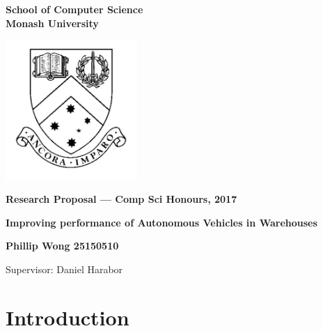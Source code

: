 \documentclass[a4paper,11pt]{article}
\begin{document}
\thispagestyle{empty} %
\renewcommand{\thepage}{\roman{page}}

\begin{spacing}{1.5}
\begin{center}
{\Large \bfseries
School of Computer Science \\
Monash University}

\vspace*{30mm}

\includegraphics[width=5cm]{MonashCrest.pdf}

\vspace*{15mm}

{\large \bfseries
Research Proposal --- Comp Sci Honours, 2017
}

\vspace*{10mm}

{\LARGE \bfseries
Improving performance of Autonomous Vehicles in Warehouses
}

\vspace*{20mm}

{\large \bfseries
Phillip Wong 25150510

\vspace*{20mm}


Supervisor: Daniel Harabor
}

\end{center}
\end{spacing}

\newpage

\tableofcontents

\newpage
\setcounter{page}{1}
\renewcommand{\thepage}{\arabic{page}}

\section{Introduction}
\end{document}
